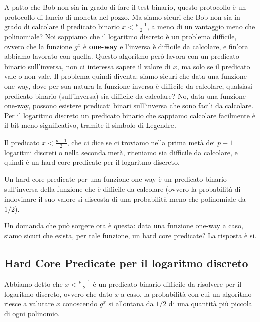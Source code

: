 A patto che Bob non sia in grado di fare il test binario, questo protocollo è un protocollo di lancio di moneta nel pozzo. Ma siamo sicuri che Bob non sia in grado di calcolare il predicato binario $x < \frac{p-1}{2}$, a meno di un vantaggio meno che polinomiale? 
Noi sappiamo che il logaritmo discreto è un problema difficile, ovvero che la funzione $g^x$ è \textbf{one-way} e l'inversa è difficile da calcolare, e fin'ora abbiamo lavorato con quella. Questo algoritmo però lavora con un predicato binario sull'inversa, non ci interessa sapere il valore di $x$, ma solo se il predicato vale o non vale. Il problema quindi diventa: siamo sicuri che data una funzione one-way, dove per sua natura la funzione inversa è difficile da calcolare, qualsiasi predicato binario (sull'inversa) sia difficile da calcolare?  No, data una funzione one-way, possono esistere predicati binari sull'inversa che sono facili da calcolare. Per il logaritmo discreto un predicato binario che sappiamo calcolare facilmente è il bit meno significativo, tramite il simbolo di Legendre.

Il predicato $x < \frac{p-1}{2}$, che ci dice se ci troviamo nella prima metà dei $p-1$ logaritmi discreti o nella seconda metà, riteniamo sia difficile da calcolare, e quindi è un hard core predicate per il logaritmo discreto.

\begin{definition}
Un hard core predicate per una funzione one-way è un predicato binario sull'inversa della funzione che è difficile da calcolare (ovvero la probabilità di indovinare il suo valore si discosta di una probabilità meno che polinomiale da $1/2$).
\end{definition}

\noindent Un domanda che può sorgere ora è questa: data una funzione one-way a caso, siamo sicuri che esista, per tale funzione, un hard core predicate? La risposta è si.

\subsection{Hard Core Predicate per il logaritmo discreto}
Abbiamo detto che $x < \frac{p-1}{2}$ è un predicato binario difficile da risolvere per il logaritmo discreto, ovvero che dato $x$ a caso, la probabilità con cui un algoritmo riesce a valutare $x$ conoscendo $g^x$ si allontana da $1/2$ di una quantità più piccola di ogni polinomio.

